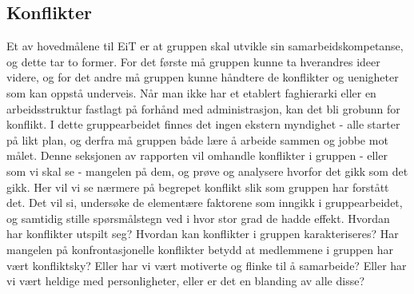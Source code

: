 \subsection{Konflikter}

Et av hovedmålene til EiT er at gruppen skal utvikle sin samarbeidskompetanse\cite{eitlaeringsmaal}, og dette tar to former.
For det første må gruppen kunne ta hverandres ideer videre, og for det andre må gruppen kunne håndtere de konflikter og uenigheter som kan oppstå underveis.
Når man ikke har et etablert faghierarki eller en arbeidsstruktur fastlagt på forhånd med administrasjon, kan det bli grobunn for konflikt. 
I dette gruppearbeidet finnes det ingen ekstern myndighet - alle starter på likt plan, og derfra må gruppen både lære å arbeide sammen og jobbe mot målet. 
Denne seksjonen av rapporten vil omhandle konflikter i gruppen - eller som vi skal se - mangelen på dem, og prøve og analysere hvorfor det gikk som det gikk.
Her vil vi se nærmere på begrepet konflikt slik som gruppen har forstått det.
Det vil si, undersøke de elementære faktorene som inngikk i gruppearbeidet, og samtidig stille spørsmålstegn ved i hvor stor grad de hadde effekt.
Hvordan har konflikter utspilt seg?
Hvordan kan konflikter i gruppen karakteriseres? 
Har mangelen på konfrontasjonelle konflikter betydd at medlemmene i gruppen har vært konfliktsky? Eller har vi vært motiverte og flinke til å samarbeide? Eller har vi vært heldige med personligheter, eller er det en blanding av alle disse?
\\